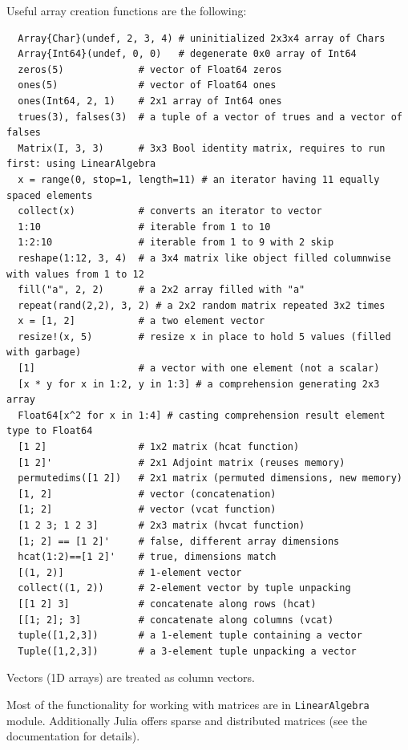 \documentclass[10pt,a4paper]{article}
\begin{document}
Useful array creation functions are the following:
\begin{lstlisting}
  Array{Char}(undef, 2, 3, 4) # uninitialized 2x3x4 array of Chars
  Array{Int64}(undef, 0, 0)   # degenerate 0x0 array of Int64
  zeros(5)             # vector of Float64 zeros
  ones(5)              # vector of Float64 ones
  ones(Int64, 2, 1)    # 2x1 array of Int64 ones
  trues(3), falses(3)  # a tuple of a vector of trues and a vector of falses
  Matrix(I, 3, 3)      # 3x3 Bool identity matrix, requires to run first: using LinearAlgebra
  x = range(0, stop=1, length=11) # an iterator having 11 equally spaced elements
  collect(x)           # converts an iterator to vector
  1:10                 # iterable from 1 to 10
  1:2:10               # iterable from 1 to 9 with 2 skip
  reshape(1:12, 3, 4)  # a 3x4 matrix like object filled columnwise with values from 1 to 12
  fill("a", 2, 2)      # a 2x2 array filled with "a"
  repeat(rand(2,2), 3, 2) # a 2x2 random matrix repeated 3x2 times
  x = [1, 2]           # a two element vector
  resize!(x, 5)        # resize x in place to hold 5 values (filled with garbage)
  [1]                  # a vector with one element (not a scalar)
  [x * y for x in 1:2, y in 1:3] # a comprehension generating 2x3 array
  Float64[x^2 for x in 1:4] # casting comprehension result element type to Float64
  [1 2]                # 1x2 matrix (hcat function)
  [1 2]'               # 2x1 Adjoint matrix (reuses memory)
  permutedims([1 2])   # 2x1 matrix (permuted dimensions, new memory)
  [1, 2]               # vector (concatenation)
  [1; 2]               # vector (vcat function)
  [1 2 3; 1 2 3]       # 2x3 matrix (hvcat function)
  [1; 2] == [1 2]'     # false, different array dimensions
  hcat(1:2)==[1 2]'    # true, dimensions match
  [(1, 2)]             # 1-element vector
  collect((1, 2))      # 2-element vector by tuple unpacking
  [[1 2] 3]            # concatenate along rows (hcat)
  [[1; 2]; 3]          # concatenate along columns (vcat)
  tuple([1,2,3])       # a 1-element tuple containing a vector
  Tuple([1,2,3])       # a 3-element tuple unpacking a vector
\end{lstlisting}
Vectors (1D arrays) are treated as column vectors.

Most of the functionality for working with matrices are in
\lstinline|LinearAlgebra| module. Additionally Julia offers sparse and
distributed matrices (see the documentation for details).
\end{document}
